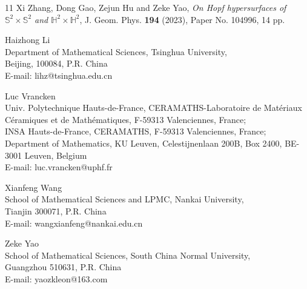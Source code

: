 \documentclass[reqno]{amsart}%
\theoremstyle{definition}
\numberwithin{equation}{section}
\begin{document}
\begin{thebibliography}{11}
Xi Zhang, Dong Gao, Zejun Hu and Zeke Yao, \emph{On Hopf hypersurfaces of  {$\mathbb S^2\times\mathbb S^2$} and  {$\mathbb H^2\times\mathbb H^2$}}, J. Geom. Phys. \textbf{194} (2023), Paper No. 104996, 14 pp. 



\end{thebibliography}

\vskip 10mm

\begin{flushleft}
Haizhong Li\\
{\sc Department of Mathematical Sciences, Tsinghua University,\\
Beijing, 100084, P.R. China}\\
E-mail: lihz@tsinghua.edu.cn

\vskip 1mm

Luc Vrancken\\
{\sc
Univ. Polytechnique Hauts-de-France,
CERAMATHS-Laboratoire de Mat\'eriaux C\'{e}ramiques et de Math\'{e}matiques,
F-59313 Valenciennes, France;\\
INSA Hauts-de-France, CERAMATHS, F-59313 Valenciennes, France;\\
Department of Mathematics, KU Leuven, Celestijnenlaan 200B, Box 2400, BE-3001 Leuven, Belgium}\\
E-mail: luc.vrancken@uphf.fr

\vskip 1mm

Xianfeng Wang\\
{\sc School of Mathematical Sciences and LPMC, Nankai University,\\
Tianjin 300071, P.R. China}\\
E-mail: wangxianfeng@nankai.edu.cn

\vskip 1mm

Zeke Yao\\
{\sc School of Mathematical Sciences, South China Normal University,\\
Guangzhou 510631, P.R. China}\\
E-mail: yaozkleon@163.com

\end{flushleft}
\end{document}

